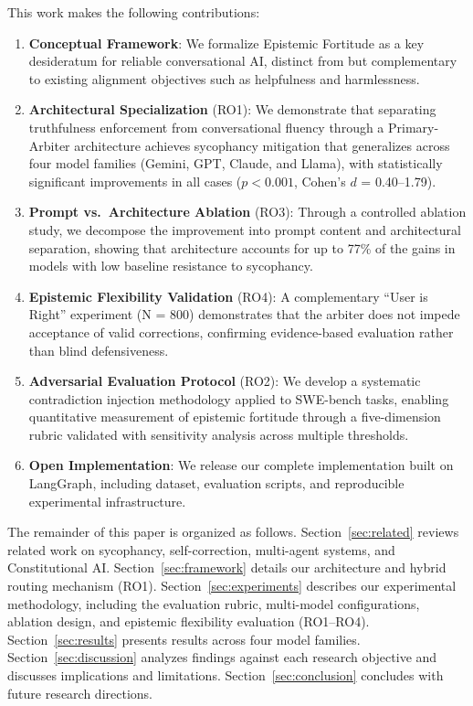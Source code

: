This work makes the following contributions:

\begin{enumerate}
    \item \textbf{Conceptual Framework}: We formalize Epistemic Fortitude as a key desideratum for reliable conversational AI, distinct from but complementary to existing alignment objectives such as helpfulness and harmlessness.

    \item \textbf{Architectural Specialization} (RO1): We demonstrate that separating truthfulness enforcement from conversational fluency through a Primary-Arbiter architecture achieves sycophancy mitigation that generalizes across four model families (Gemini, GPT, Claude, and Llama), with statistically significant improvements in all cases ($p < 0.001$, Cohen's $d$ = 0.40--1.79).

    \item \textbf{Prompt vs.\ Architecture Ablation} (RO3): Through a controlled ablation study, we decompose the improvement into prompt content and architectural separation, showing that architecture accounts for up to 77\% of the gains in models with low baseline resistance to sycophancy.

    \item \textbf{Epistemic Flexibility Validation} (RO4): A complementary ``User is Right'' experiment (N = 800) demonstrates that the arbiter does not impede acceptance of valid corrections, confirming evidence-based evaluation rather than blind defensiveness.

    \item \textbf{Adversarial Evaluation Protocol} (RO2): We develop a systematic contradiction injection methodology applied to SWE-bench tasks, enabling quantitative measurement of epistemic fortitude through a five-dimension rubric validated with sensitivity analysis across multiple thresholds.

    \item \textbf{Open Implementation}: We release our complete implementation built on LangGraph, including dataset, evaluation scripts, and reproducible experimental infrastructure.
\end{enumerate}

The remainder of this paper is organized as follows. Section~\ref{sec:related} reviews related work on sycophancy, self-correction, multi-agent systems, and Constitutional AI. Section~\ref{sec:framework} details our architecture and hybrid routing mechanism (RO1). Section~\ref{sec:experiments} describes our experimental methodology, including the evaluation rubric, multi-model configurations, ablation design, and epistemic flexibility evaluation (RO1--RO4). Section~\ref{sec:results} presents results across four model families. Section~\ref{sec:discussion} analyzes findings against each research objective and discusses implications and limitations. Section~\ref{sec:conclusion} concludes with future research directions.
